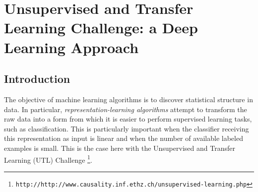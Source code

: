 \newcommand{\squeezeup}{\vspace{-2.5mm}}

\chapter{Unsupervised and Transfer Learning Challenge: a Deep Learning Approach\label{chap:utlc}}

\section{Introduction}


The objective of machine learning algorithms is to discover statistical structure
in data. In particular, {\em representation-learning algorithms} attempt to
transform the raw data into a form from which it is easier to perform
supervised learning tasks, such as classification. This is particularly important
when the classifier receiving this representation as input is linear
and when the number of available labeled examples is small. This is the
case here with the Unsupervised and Transfer Learning (UTL) Challenge
\footnote{\tt http://http://www.causality.inf.ethz.ch/unsupervised-learning.php}.

